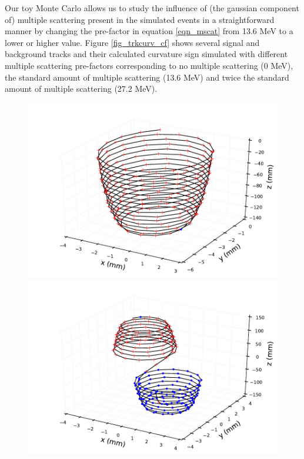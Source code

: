 \documentclass{JINST}
\begin{document}
Our toy Monte Carlo allows us to study the influence of (the gaussian component of) multiple scattering present in the simulated events in a
straightforward manner by changing the pre-factor in equation \ref{eqn_mscat} from 13.6 MeV to a lower or higher value.  
Figure \ref{fig_trkcurv_cf} shows several signal and background tracks and their calculated curvature sign 
simulated with different multiple scattering pre-factors corresponding to no multiple scattering (0 MeV), the 
standard amount of multiple scattering (13.6 MeV) and twice the standard amount of multiple scattering (27.2 
MeV).  

\begin{figure}[!htb]
	\includegraphics[scale=0.48]{fig/plt_trkcurv_magse05_ms0_0.pdf}
	\includegraphics[scale=0.48]{fig/plt_trkcurv_magbb05_ms0_1.pdf}

\end{figure}
\end{document}

